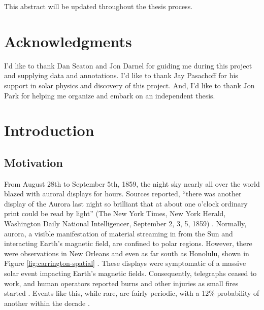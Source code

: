 \documentclass[twoside]{report}
\begin{document}
This abstract will be updated throughout the thesis process.

\chapter*{Acknowledgments}
I'd like to thank Dan Seaton and Jon Darnel for guiding me during this project and supplying data and annotations.  I'd like to thank Jay Pasachoff for his support in solar physics and discovery of this project. And, I'd like to thank Jon Park for helping me organize and embark on an independent thesis.

\chapter{Introduction}
\section{Motivation}
From August 28th to September 5th, 1859, the night sky nearly all over the world blazed with auroral displays for hours. Sources reported, ``there was another display of the Aurora last night so brilliant that at about one o’clock ordinary print could be read by light'' (The New York Times, New York Herald, Washington Daily National Intelligencer, September 2, 3, 5, 1859) \cite{green:2006}. Normally, aurora, a visible manifestation of material streaming in from the Sun and interacting Earth's magnetic field, are confined to polar regions. However, there were observations in New Orleans and even as far south as Honolulu, shown in Figure \ref{fig:carrington-spatial}  \cite{cliver:2004}. These displays were symptomatic of a massive solar event impacting Earth's magnetic fields. Consequently, telegraphs ceased to work, and human operators reported burns and other injuries as small fires started \cite{green:2006}. Events like this, while rare, are fairly periodic, with a 12\% probability of another within the decade \cite{riley:2012}. 
\end{document}

